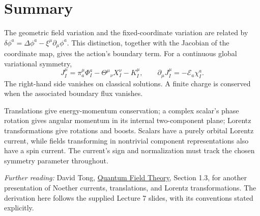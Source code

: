 \documentclass[11pt]{article}
\newcommand{\Th}{\Theta}
\newcommand{\Eul}{\mathcal E}
\begin{document}
\section*{Summary}
The geometric field variation and the fixed-coordinate variation are
related by \(\delta\phi^a=\Delta\phi^a-\xi^\mu\partial_\mu\phi^a\).
This distinction, together with the Jacobian of the coordinate map, gives
the action's boundary term. For a continuous global variational symmetry,
\begin{equation*}
J_I^\mu=\pi_a^\mu\Phi_I^a-\Th^\mu{}_{\nu}X_I^\nu-K_I^\mu,
\qquad \partial_\mu J_I^\mu=-\Eul_a\chi_I^a.
\end{equation*}
The right-hand side vanishes on classical solutions. A finite charge is
conserved when the associated boundary flux vanishes.

Translations give energy-momentum conservation; a complex scalar's phase
rotation gives angular momentum in its internal two-component plane;
Lorentz transformations give rotations and boosts. Scalars have a purely
orbital Lorentz current, while fields transforming in nontrivial component
representations also have a spin current. The current's sign and
normalization must track the chosen symmetry parameter throughout.

\smallskip
\noindent\textit{Further reading:} David Tong,
\href{https://www.damtp.cam.ac.uk/user/tong/qft.htm}{Quantum Field Theory},
Section 1.3, for another presentation of Noether currents, translations,
and Lorentz transformations. The derivation here follows the supplied
Lecture 7 slides, with its conventions stated explicitly.
\end{document}
